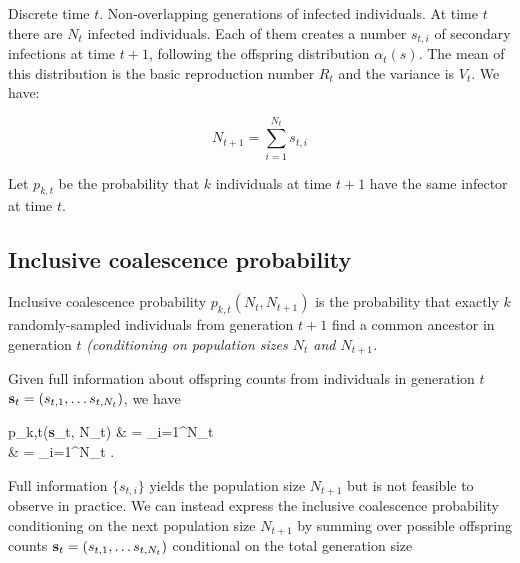 \documentclass{article}
\let\oldalign\align
\let\oldendalign\endalign
\renewenvironment{align}{\linenomathNonumbers\oldalign}{\oldendalign\endlinenomath}
\begin{document}
Discrete time $t$. Non-overlapping generations of infected individuals. At time $t$ there are $N_t$ infected individuals. Each of them creates a number $s_{t,i}$ of secondary infections at time $t+1$, following the offspring distribution $\alpha_t(s)$. The mean of this distribution is the basic reproduction number $R_t$ and the variance is $V_t$. We have:

\begin{equation}
N_{t+1}=\sum_{i=1}^{N_t} s_{t,i}
\label{eq:summation}
\end{equation}

Let $p_{k,t}$ be the probability that $k$ individuals at time $t+1$ have the same infector at time $t$.

\subsection{Inclusive coalescence probability}

Inclusive coalescence probability $p_{k,t}(N_t, N_{t+1})$ is the probability that exactly $k$ randomly-sampled individuals from generation $t+1$ find a common ancestor in generation $t$ {\it (conditioning on population sizes $N_t$ and $N_{t+1}$.}

Given full information about offspring counts from individuals in generation $t$ ${\bf s}_t = (s_{t,1}, \dots s_{t, N_t})$, we have

{\allowdisplaybreaks
	\begin{align}
		p_{k,t}({\bf s}_t, N_t)
			& = \sum_{i=1}^{N_t}  \nonumber\\
			& = \sum_{i=1}^{N_t} .%
	\end{align}
}

Full information $\{s_{t,i}\}$ yields the population size $N_{t+1}$ but is not feasible to observe in practice.
We can instead express the inclusive coalescence probability conditioning on the next population size $N_{t+1}$ by summing over possible offspring counts ${\bf s}_t = (s_{t,1}, \dots s_{t, N_t})$ conditional on the total generation size
\end{document}
